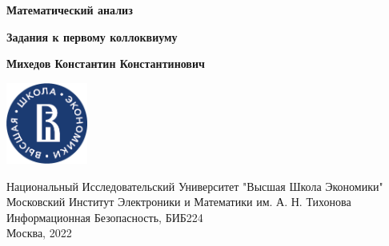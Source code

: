 \documentclass[a4paper,12pt]{article}
\begin{document}
  \begin{titlepage}
    \begin{center}
      \vspace*{1.5cm}

      \Huge
      \textbf{Математический анализ}

      \vspace{0.5cm} \large
      \textbf{Задания к первому коллоквиуму}

      \vspace{1.5cm} \normalsize
      \textbf{Михедов Константин Константинович}

      \vfill

      \includegraphics[width=0.2\textwidth]{hse_logo}

      \vspace{1cm} \footnotesize
      Национальный Исследовательский Университет "Высшая Школа Экономики" \\
      Московский Институт Электроники и Математики им. А. Н. Тихонова \\
      Информационная Безопасность, БИБ224 \\
      Москва, 2022
    \end{center}
  \end{titlepage}
\end{document}
